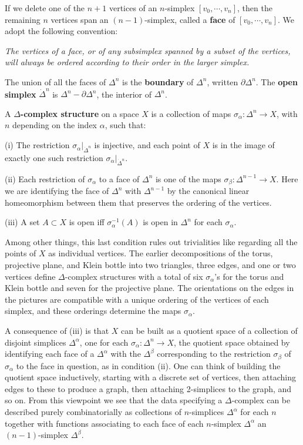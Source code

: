 If we delete one of the $n + 1$ vertices of an $n$-simplex $[v_0, \cdots, v_n]$, then the remaining $n$ vertices span an $(n - 1)$-simplex, called a \textbf{face} of $[v_0, \cdots, v_n]$. We adopt the following convention:

\textit{The vertices of a face, or of any subsimplex spanned by a subset of the vertices, will always be ordered according to their order in the larger simplex.}

The union of all the faces of $\Delta^n$ is the \textbf{boundary} of $\Delta^n$, written $\partial \Delta^n$. The \textbf{open simplex} $\dot{\Delta}^n$ is $\Delta^n - \partial \Delta^n$, the interior of $\Delta^n$.

A \textbf{$\Delta$-complex structure} on a space $X$ is a collection of maps $\sigma_\alpha: \Delta^n \to X$, with $n$ depending on the index $\alpha$, such that:

(i) The restriction $\sigma_\alpha|_{\dot{\Delta}^n}$ is injective, and each point of $X$ is in the image of exactly one such restriction $\sigma_\alpha|_{\dot{\Delta}^n}$.

(ii) Each restriction of $\sigma_\alpha$ to a face of $\Delta^n$ is one of the maps $\sigma_\beta: \Delta^{n-1} \to X$. Here we are identifying the face of $\Delta^n$ with $\Delta^{n-1}$ by the canonical linear homeomorphism between them that preserves the ordering of the vertices.

(iii) A set $A \subset X$ is open iff $\sigma_\alpha^{-1}(A)$ is open in $\Delta^n$ for each $\sigma_\alpha$.

Among other things, this last condition rules out trivialities like regarding all the
points of $X$ as individual vertices. The earlier decompositions of the torus, projective
plane, and Klein bottle into two triangles, three edges, and one or two vertices define
$\Delta$-complex structures with a total of six $\sigma_\alpha$'s for the torus and Klein bottle and seven
for the projective plane. The orientations on the edges in the pictures are compatible
with a unique ordering of the vertices of each simplex, and these orderings determine
the maps $\sigma_\alpha$.

A consequence of (iii) is that $X$ can be built as a quotient space of a collection
of disjoint simplices $\Delta^\alpha$, one for each $\sigma_\alpha:\Delta^n \to X$, the quotient space obtained by
identifying each face of a $\Delta^\alpha$ with the $\Delta^\beta$ corresponding to the restriction $\sigma_\beta$ of
$\sigma_\alpha$ to the face in question, as in condition (ii). One can think of building the quotient
space inductively, starting with a discrete set of vertices, then attaching edges to
these to produce a graph, then attaching 2-simplices to the graph, and so on. From
this viewpoint we see that the data specifying a $\Delta$-complex can be described purely
combinatorially as collections of $n$-simplices $\Delta^\alpha$ for each $n$ together with functions
associating to each face of each $n$-simplex $\Delta^\alpha$ an $(n-1)$-simplex $\Delta^\beta$.

